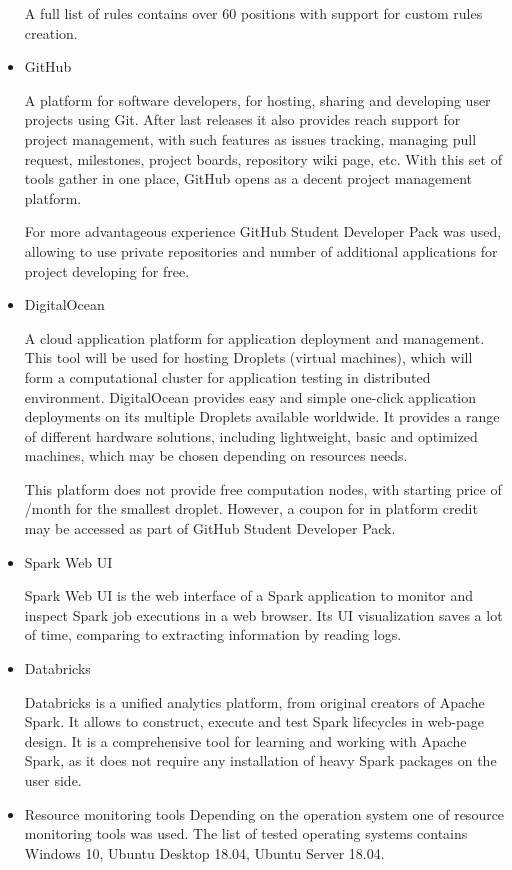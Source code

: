 \begin{itemize}
A full list of rules contains over 60 positions with support for custom rules creation.
\smallskip

\item GitHub

A platform for software developers, for hosting, sharing and developing user projects using Git. After last releases it also provides reach support for project management, with such features as issues tracking, managing pull request, milestones, project boards, repository wiki page, etc. With this set of tools  gather in one place, GitHub opens as a decent project management platform.

For more advantageous experience GitHub Student Developer Pack was used, allowing to use private repositories and number of additional applications for project developing for free.
\smallskip

\item DigitalOcean

A cloud application platform for application deployment and management. This tool will be used for hosting Droplets (virtual machines), which will form a computational cluster for application testing in distributed environment. DigitalOcean provides easy and simple one-click application deployments on its multiple Droplets available worldwide. It provides a range of different hardware solutions, including lightweight, basic and optimized machines, which may be chosen depending on resources needs.

This platform does not provide free computation nodes, with starting price of /month for the smallest droplet. However, a coupon for  in platform credit may be accessed as part of GitHub Student Developer Pack.
\smallskip

\item Spark Web UI

Spark Web UI is the web interface of a Spark application to monitor and inspect Spark job executions in a web browser. Its UI visualization saves a lot of time, comparing to extracting information by reading logs.
\smallskip

\item Databricks

Databricks is a unified analytics platform, from original creators of Apache Spark. It allows to construct, execute and test Spark lifecycles in web-page design. It is a comprehensive tool for learning and working with Apache Spark, as it does not require any installation of heavy Spark packages on the user side.
\smallskip

\item Resource monitoring tools
Depending on the operation system one of resource monitoring tools was used. The list of tested operating systems contains Windows 10, Ubuntu Desktop 18.04, Ubuntu Server 18.04.
\smallskip 
\end{itemize}

